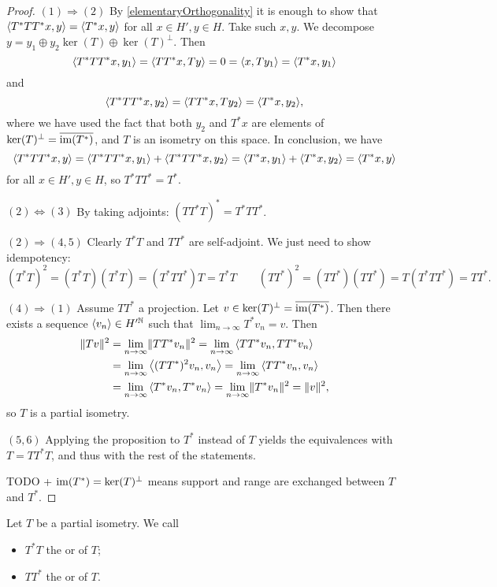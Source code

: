 \begin{proof}

$\boxed{(1)\Rightarrow (2)}$ By \ref{elementaryOrthogonality} it is enough to show that $\inner{T^*TT^*x,y} = \inner{T^*x,y}$ for all $x\in H', y\in H$. Take such $x,y$. We decompose $y = y_1\oplus y_2 \ker(T)\oplus \ker(T)^\perp$. Then
\[ \inner{T^*TT^*x, y_1} = \inner{TT^*x, Ty} = 0 = \inner{x,Ty_1} = \inner{T^*x, y_1} \]
and
\[ \inner{T^*TT^*x, y_2} = \inner{TT^*x, Ty_2} = \inner{T^*x,y_2}, \]
where we have used the fact that both $y_2$ and $T^*x$ are elements of $\ker(T)^\perp = \overline{\operatorname{im}(T^*)}$, and $T$ is an isometry on this space. In conclusion, we have
\[ \inner{T^*TT^*x,y} = \inner{T^*TT^*x,y_1} + \inner{T^*TT^*x,y_2} = \inner{T^*x,y_1} + \inner{T^*x,y_2} = \inner{T^*x,y} \]
for all $x\in H', y\in H$, so $T^*TT^* = T^*$.

$\boxed{(2) \Leftrightarrow (3)}$ By taking adjoints: $(TT^*T)^* = T^*TT^*$.

$\boxed{(2) \Rightarrow (4,5)}$ Clearly $T^*T$ and $TT^*$ are self-adjoint. We just need to show idempotency:
\[ (T^*T)^2 = (T^*T)(T^*T) = (T^*TT^*)T = T^*T \qquad (TT^*)^2 = (TT^*)(TT^*) = T(T^*TT^*) = TT^*. \]

$\boxed{(4) \Rightarrow (1)}$ Assume $TT^*$ a projection. Let $v\in \ker(T)^\perp = \overline{\operatorname{im}(T^*)}$. Then there exists a sequence $\left\langle v_n \right\rangle\in H^{\prime\mathbb{N}}$ such that $\lim_{n\to\infty}T^*v_n = v$. Then
\begin{align*}
\norm{Tv}^2 &= \lim_{n\to\infty}\norm{TT^*v_n}^2 = \lim_{n\to\infty}\inner{TT^*v_n,TT^*v_n} \\
&= \lim_{n\to\infty}\inner{(TT^*)^2v_n,v_n} = \lim_{n\to\infty}\inner{TT^*v_n,v_n} \\
&= \lim_{n\to\infty}\inner{T^*v_n,T^*v_n} = \lim_{n\to\infty}\norm{T^*v_n}^2 = \norm{v}^2,
\end{align*}
so $T$ is a partial isometry.

$\boxed{(5,6)}$ Applying the proposition to $T^*$ instead of $T$ yields the equivalences with $T=TT^*T$, and thus with the rest of the statements.

TODO + $\operatorname{im}(T^*) = \ker(T)^\perp$ means support and range are exchanged between $T$ and $T^*$.
\end{proof}

\begin{definition}
Let $T$ be a partial isometry. We call
\begin{itemize}
\item $T^*T$ the  or  of $T$;
\item $TT^*$ the  or  of $T$.
\end{itemize}
\end{definition}


